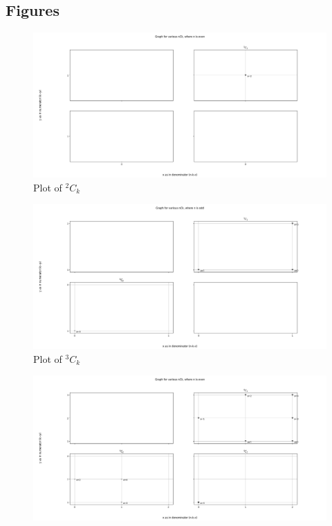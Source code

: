 \documentclass[10pt, twoside]{article}
\newcommand*{\Combination}[2]{{}^{#1}C_{#2}}%
\begin{document}
\begin{appendices}
\section{Figures}
\begin{figure}[ph!]
	\includegraphics[width=\linewidth]{2Ck.png}
	\caption{Plot of $\Combination{2}{k}$}
	\label{2Ck}
\end{figure}
\begin{figure}[ph!]	
	\includegraphics[width=\linewidth]{3Ck.png}
	\caption{Plot of $\Combination{3}{k}$}
	\label{3Ck}
\end{figure}
\begin{figure}[ph!]	
	\includegraphics[width=\linewidth]{4Ck.png}

\end{figure}
\end{appendices}
\end{document}
